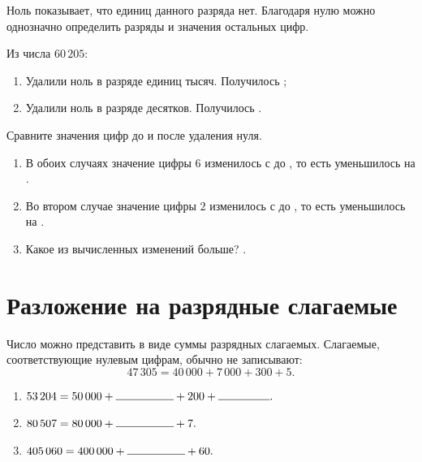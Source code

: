 \begin{notebox}[Правило]
  Ноль показывает, что единиц данного разряда нет. Благодаря нулю можно
  однозначно определить разряды и значения остальных цифр.
\end{notebox}

\begin{practicebox}
  Из числа \(60\,205\):
  \begin{enumerate}[label=\textbf{\arabic*.}]
    \item Удалили ноль в разряде единиц тысяч. Получилось \answerblank[26mm];
    \item Удалили ноль в разряде десятков. Получилось \answerblank[26mm].
  \end{enumerate}
  Сравните значения цифр до и после удаления нуля.
  \begin{enumerate}[label=\textbf{\arabic*.}]
    \item В обоих случаях значение цифры \(6\) изменилось с
      \answerblank[19mm] до \answerblank[19mm], то есть уменьшилось на
      \answerblank[22mm].
    \item Во втором случае значение цифры \(2\) изменилось с
      \answerblank[16mm] до \answerblank[16mm], то есть уменьшилось на
      \answerblank[18mm].
    \item Какое из вычисленных изменений больше? \answerblank[42mm].
  \end{enumerate}
\end{practicebox}

\section{Разложение на разрядные слагаемые}

\begin{notebox}
  Число можно представить в виде суммы разрядных слагаемых. Слагаемые,
  соответствующие нулевым цифрам, обычно не записывают:
  \[
    47\,305=40\,000+7\,000+300+5.
  \]
\end{notebox}

\begin{fillbox}
  \begin{enumerate}[label=\textbf{\arabic*.}]
    \item \(53\,204=50\,000+\answerblank[18mm]+200+\answerblank[16mm].\)
    \item \(80\,507=80\,000+\answerblank[18mm]+7.\)
    \item \(405\,060=400\,000+\answerblank[18mm]+60.\)
  \end{enumerate}
\end{fillbox}

